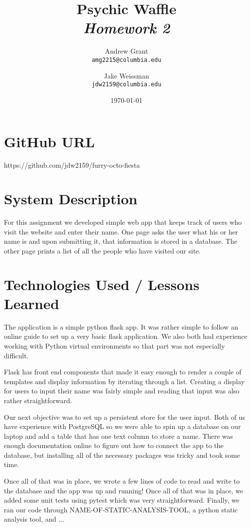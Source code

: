 \documentclass{article}
\title{Psychic Waffle \\
	\textit{Homework 2}}
\author{
    Andrew Grant\\
    \texttt{amg2215@columbia.edu}
    \and
    Jake Weissman\\
    \texttt{jdw2159@columbia.edu}
}
\date{\today}
\begin{document}
\maketitle

\section{GitHub URL}
https://github.com/jdw2159/furry-octo-fiesta

\section{System Description}
For this assignment we developed simple web app that keeps track of users who visit the website and enter their name. One page asks the user what his or her name is and upon submitting it, that information is stored in a database. The other page prints a list of all the people who have visited our site.

\section{Technologies Used / Lessons Learned}
The application is a simple python flask app. It was rather simple to follow an online guide to set up a very basic flask application. We also both had experience working with Python virtual environments so that part was not especially difficult.
\par Flask has front end components that made it easy enough to render a couple of templates and display information by iterating through a list. Creating a display for users to input their name was fairly simple and reading that input was also rather straightforward.
\par Our next objective was to set up a persistent store for the user input. Both of us have experience with PostgreSQL so we were able to spin up a database on our laptop and add a table that has one text column to store a name. There was enough documentation online to figure out how to connect the app to the database, but installing all of the necessary packages was tricky and took some time.
\par Once all of that was in place, we wrote a few lines of code to read and write to the database and the app was up and running! Once all of that was in place, we added some unit tests using pytest which was very straightforward. Finally, we ran our code through NAME-OF-STATIC-ANALYSIS-TOOL, a python static analysis tool, and ...
\end{document}
